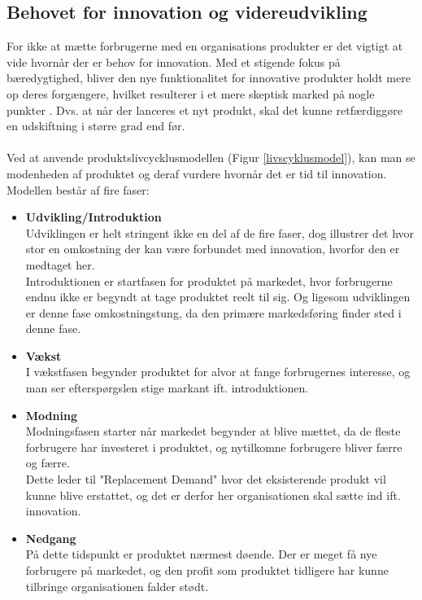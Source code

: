 \subsection{Behovet for innovation og videreudvikling}
For ikke at mætte forbrugerne med en organisations produkter er det vigtigt at vide hvornår der er behov for innovation.
Med et stigende fokus på bæredygtighed, bliver den nye funktionalitet for innovative produkter holdt mere op deres forgængere,
hvilket resulterer i et mere skeptisk marked på nogle punkter \cite[a.1]{eksamensopgave}. Dvs. at når der lanceres et nyt produkt, skal det kunne retfærdiggøre en udskiftning i større grad end før.
\\~\\Ved at anvende produktslivcycklusmodellen (Figur \ref{livscyklusmodel}), kan man se modenheden af produktet og deraf vurdere hvornår det er tid til innovation.
\\Modellen består af fire faser:
\begin{itemize}
    \item \textbf{Udvikling/Introduktion}\\Udviklingen er helt stringent ikke en del af de fire faser, dog illustrer det hvor stor en omkostning der kan være forbundet med innovation, hvorfor den er medtaget her.
    \\Introduktionen er startfasen for produktet på markedet, hvor forbrugerne endnu ikke er begyndt at tage produktet reelt til sig. Og ligesom udviklingen er denne fase omkostningstung, da den primære markedsføring finder sted i denne fase.
    \item \textbf{Vækst}\\I vækstfasen begynder produktet for alvor at fange forbrugernes interesse, og man ser efterspørgslen stige markant ift. introduktionen.
    \item \textbf{Modning}\\Modningsfasen starter når markedet begynder at blive mættet, da de fleste forbrugere har investeret i produktet, og nytilkomne forbrugere bliver færre og færre.
    \\Dette leder til "Replacement Demand" hvor det eksisterende produkt vil kunne blive erstattet, og det er derfor her organisationen skal sætte ind ift. innovation.
    \item \textbf{Nedgang}\\På dette tidspunkt er produktet nærmest døende. Der er meget få nye forbrugere på markedet, og den profit som produktet tidligere har kunne tilbringe organisationen falder stødt.
\end{itemize}
